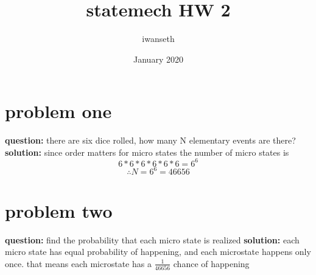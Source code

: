 \documentclass{article}
\title{statemech HW 2}
\author{iwanseth }
\date{January 2020}
\begin{document}
\maketitle

\section{problem one}
\begin{flushleft}
\textbf{question: } there are six dice rolled, how many N elementary events are there?
\bigbreak
\textbf{solution: } since order matters for micro states the number of micro states is
\[ 6*6*6*6*6*6= 6^6\]
\[ \therefore N=6^6=46656\]

\section{problem two}
\textbf{question:} find the probability that each micro state is realized
\bigbreak
\textbf{solution:} each micro state has equal probability of happening, and each microstate happens only once. that means each microstate has a $\frac{1}{46656}$ chance of happening


\end{flushleft}
\end{document}
